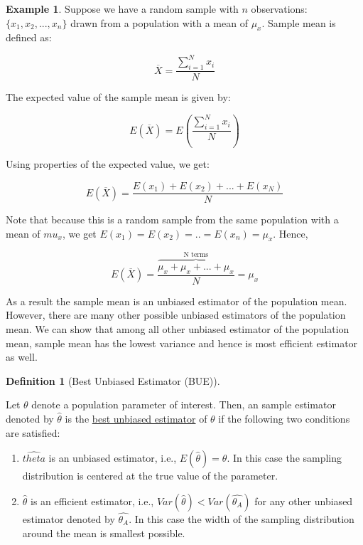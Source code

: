 \documentclass[
]{book}
\theoremstyle{definition}
\newtheorem{definition}{Definition}[chapter]
\theoremstyle{definition}
\newtheorem{example}{Example}[chapter]
\theoremstyle{definition}
\theoremstyle{definition}
\theoremstyle{remark}
\begin{document}
\begin{example}
\protect\hypertarget{exm:unnamed-chunk-46}{}\label{exm:unnamed-chunk-46}Suppose we have a random sample with \(n\) observations: \(\{x_1,x_2,...,x_n\}\) drawn from a population with a mean of \(\mu_x\). Sample mean is defined as:

\[\overline{X}=\frac{\sum_{i=1}^N x_i}{N}\]

The expected value of the sample mean is given by:

\[E(\overline{X})=E\left(\frac{\sum_{i=1}^N x_i}{N}\right)\]

Using properties of the expected value, we get:

\[E(\overline{X})=\frac{E(x_1)+E(x_2)+...+ E(x_N)}{N}\]

Note that because this is a random sample from the same population with a mean of \(mu_x\), we get \(E(x_1)=E(x_2)=..=E(x_n)=\mu_x\). Hence,

\[E(\overline{X})=\frac{\overbrace{\mu_x+\mu_x+...+\mu_x}^{\text{N terms}} }{N}=\mu_x\]

As a result the sample mean is an unbiased estimator of the population mean. However, there are many other possible unbiased estimators of the population mean. We can show that among all other unbiased estimator of the population mean, sample mean has the lowest variance and hence is most efficient estimator as well.
\end{example}

\begin{definition}[Best Unbiased Estimator (BUE)]
\protect\hypertarget{def:unnamed-chunk-47}{}\label{def:unnamed-chunk-47}

Let \(\theta\) denote a population parameter of interest. Then, an sample estimator denoted by \(\hat{\theta}\) is the \underline{best unbiased estimator} of \(\theta\) if the following two conditions are satisfied:

\begin{enumerate}
\def\labelenumi{\arabic{enumi}.}
\item
  \(\hat{theta}\) is an unbiased estimator, i.e., \(E(\hat{\theta})=\theta\). In this case the sampling distribution is centered at the true value of the parameter.
\item
  \(\hat{\theta}\) is an efficient estimator, i.e., \(Var(\hat{\theta})< Var(\hat{\theta_A})\) for any other unbiased estimator denoted by \(\hat{\theta_A}\). In this case the width of the sampling distribution around the mean is smallest possible.
\end{enumerate}

\end{definition}
\end{document}
